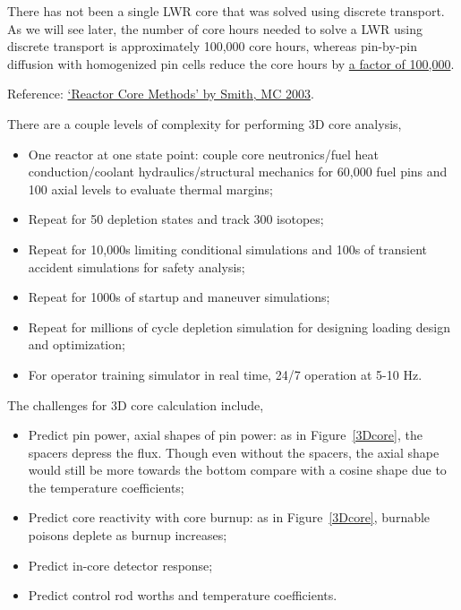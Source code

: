 \documentclass{school-22.211-notes}
\date{May  2, 2012}
\begin{document}
\maketitle

 \label{nodal-methods}
There has not been a single LWR core that was solved using discrete transport. As we will see later, the number of core hours needed to solve a LWR using discrete transport is approximately 100,000 core hours, whereas pin-by-pin diffusion with homogenized pin cells reduce the core hours by \uline{a factor of 100,000}.

Reference: \href{www.oecd-nea.org/dbprog/documents/MC03Smith.pdf}{`Reactor Core Methods' by Smith, MC 2003}.

There are a couple levels of complexity for performing 3D core analysis,
\begin{itemize}
\item One reactor at one state point: couple core neutronics/fuel heat conduction/coolant hydraulics/structural mechanics for 60,000 fuel pins and 100 axial levels to evaluate thermal margins;
\item Repeat for 50 depletion states and track 300 isotopes;
\item Repeat for 10,000s limiting conditional simulations and 100s of transient accident simulations for safety analysis;
\item Repeat for 1000s of startup and maneuver simulations;
\item Repeat for millions of cycle depletion simulation for designing loading design and optimization;
\item For operator training simulator in real time, 24/7 operation at 5-10 Hz. 
\end{itemize}
The challenges for 3D core calculation include,
\begin{itemize}
\item Predict pin power, axial shapes of pin power: as in Figure~\ref{3Dcore}, the spacers depress the flux. Though even without the spacers, the axial shape would still be more towards the bottom compare with a cosine shape due to the temperature coefficients; 
\item Predict core reactivity with core burnup: as in Figure~\ref{3Dcore}, burnable poisons deplete as burnup increases;
\item Predict in-core detector response;
\item Predict control rod worths and temperature coefficients. 
\end{itemize}
\end{document}

